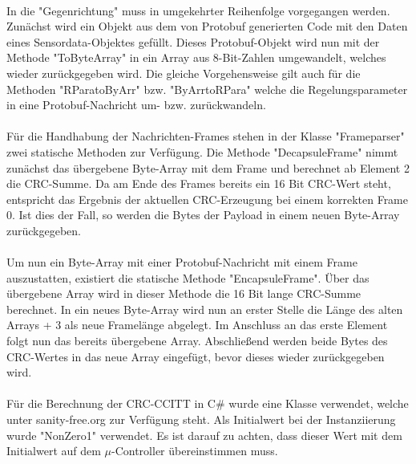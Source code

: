 \paragraph{}
In die "Gegenrichtung" muss in umgekehrter Reihenfolge vorgegangen werden. Zunächst wird ein Objekt aus dem von Protobuf generierten Code mit den Daten eines Sensordata-Objektes gefüllt. Dieses Protobuf-Objekt wird nun mit der Methode "ToByteArray" in ein Array aus 8-Bit-Zahlen umgewandelt, welches wieder zurückgegeben wird. Die gleiche Vorgehensweise gilt auch für die Methoden "RParatoByArr" bzw. "ByArrtoRPara" welche die Regelungsparameter in eine Protobuf-Nachricht um- bzw. zurückwandeln.
\paragraph{}
Für die Handhabung der Nachrichten-Frames stehen in der Klasse "Frameparser" zwei statische Methoden zur Verfügung. Die Methode "DecapsuleFrame" nimmt zunächst das übergebene Byte-Array mit dem Frame und berechnet ab Element 2 die CRC-Summe. Da am Ende des Frames bereits ein 16 Bit CRC-Wert steht, entspricht das Ergebnis der aktuellen CRC-Erzeugung bei einem korrekten Frame 0. Ist dies der Fall, so werden die Bytes der Payload in einem neuen Byte-Array zurückgegeben.
\paragraph{}
Um nun ein Byte-Array mit einer Protobuf-Nachricht mit einem Frame auszustatten, existiert die statische Methode "EncapsuleFrame". Über das übergebene Array wird in dieser Methode die 16 Bit lange CRC-Summe berechnet. In ein neues Byte-Array wird nun an erster Stelle die Länge des alten Arrays + 3 als neue Framelänge abgelegt. Im Anschluss an das erste Element folgt nun das bereits übergebene Array. Abschließend werden beide Bytes des CRC-Wertes in das neue Array eingefügt, bevor dieses wieder zurückgegeben wird.
\paragraph{}
Für die Berechnung der CRC-CCITT in C\# wurde eine Klasse verwendet, welche unter sanity-free.org \cite{crc} zur Verfügung steht. Als Initialwert bei der Instanziierung wurde "NonZero1" verwendet. Es ist darauf zu achten, dass dieser Wert mit dem Initialwert auf dem $\mu$-Controller übereinstimmen muss.
